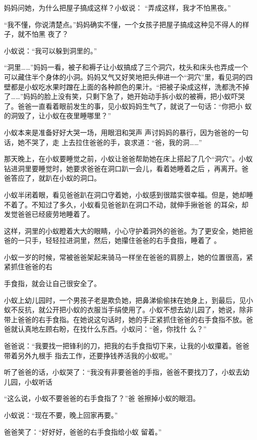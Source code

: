 \documentclass{article}
\begin{document}
妈妈问她，为什么把屋子搞成这样？小蚁说：
“弄成这样，我才不怕黑夜。” 

“我不懂，你说清楚点。”妈妈确实不懂，一个女孩子把屋子搞成这种见不得人的样子，就不怕黑
夜了？ 


小蚁说：“我可以躲到洞里的。” 

“洞里……”妈妈一看，被子和褥子让小蚁搞成了三个洞穴，枕头和床头也弄成一个可以藏住半个身体的小洞。妈妈又气又好笑地把头伸进一个“洞穴”里，看见洞的四壁都是小蚁吃水果时蹭在上面的各种颜色的果汁。“把被子染成这样，洗都洗不掉了……”妈妈的脸上没有笑，只剩下急了，她开始动手拆小蚁的被褥，把小蚁吓哭了。爸爸一直看着眼前发生的事，见小蚁妈妈生气了，就说了一句话：“你把小
蚁的洞毁了，让小蚁在夜里睡哪里？” 

小蚁本来是准备好好大哭一场，用眼泪和哭声
\newpage
声讨妈妈的暴行，因为爸爸的一句话，她不哭了，走
上去拉住爸爸的手，哀求道：“爸，我的洞……” 

那天晚上，在小蚁要睡觉之前，小蚁让爸爸帮助她在床上搭起了几个“洞穴”。小蚁钻进洞里要睡觉时，她要求爸爸在洞口趴一会儿，看着她睡着之后
，再离开。爸爸答应了，就趴在小蚁的洞口。 

小蚁半闭着眼，看见爸爸趴在洞口守着她，小蚁感到很踏实很幸福。但是，她却睡不着了。不知过了多久，小蚁看见爸爸趴在洞口不动，就伸手揪爸爸
的耳朵，却发觉爸爸已经疲劳地睡着了。 

这样，洞里的小蚁瞪着大大的眼睛，小心守护着洞外的爸爸。为了更安全，她把爸爸的一只手，轻轻拉进洞里，然后，她攥住爸爸的右手食指，睡着了
。 

小蚁一岁的时候，常被爸爸架起来骑马一样坐在爸爸的肩膀上，她的位置很高，紧紧抓住爸爸的右

\newpage
手食指，就会让自己很安全了。 

小蚁上幼儿园时，一个男孩子老是欺负她，把鼻涕偷偷抹在她身上，到最后，见小蚁不反抗，就公开把小蚁的衣服当手绢使用了。小蚁不想去幼儿园了，她说，除非带上爸爸的右手食指。在她说这句话时，她的手正紧抓住爸爸的右手食指不放。爸爸就认真地左顾右盼，在找什么东西。小蚁问：“爸，你找什
么？” 

爸爸说：“我要找一把锋利的刀，把我的右手食指切下来，让我的小蚁攥着。爸爸带着另外九根手
指去工作，还要挣钱养活我的小蚁呢。” 

听了爸爸的话，小蚁哭了：“我没有非要爸爸的手指，爸爸不要找刀了，小蚁去幼儿园，小蚁听话

“这么说，小蚁不要爸爸的右手食指了？”爸
爸擦掉小蚁的眼泪。 


小蚁说：“现在不要，晚上回家再要。” 

\newpage

爸爸笑了：“好好好，爸爸的右手食指给小蚁
留着。” 
\end{document}
